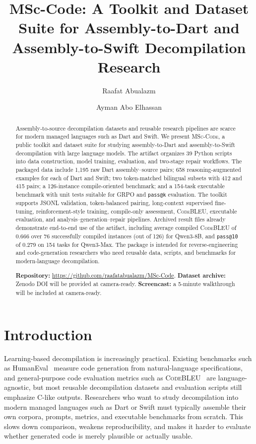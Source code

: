 \documentclass[sigconf,review]{acmart}
\title{MSc-Code: A Toolkit and Dataset Suite for Assembly-to-Dart and Assembly-to-Swift Decompilation Research}
\author{Raafat Abualazm}
\affiliation{%
  \institution{Faculty of Engineering, Cairo University}
  \city{Giza}
  \country{Egypt}
}
\author{Ayman Abo Elhassan}
\affiliation{%
  \institution{Faculty of Engineering, Cairo University}
  \city{Giza}
  \country{Egypt}
}
\begin{document}
\begin{abstract}
Assembly-to-source decompilation datasets and reusable research pipelines are scarce for modern managed languages such as Dart and Swift. We present \textsc{MSc-Code}, a public toolkit and dataset suite for studying assembly-to-Dart and assembly-to-Swift decompilation with large language models. The artifact organizes 39 Python scripts into data construction, model training, evaluation, and two-stage repair workflows. The packaged data include 1,195 raw Dart assembly--source pairs; 658 reasoning-augmented examples for each of Dart and Swift; two token-matched bilingual subsets with 412 and 415 pairs; a 126-instance compile-oriented benchmark; and a 154-task executable benchmark with unit tests suitable for GRPO and \texttt{pass@k} evaluation. The toolkit supports JSONL validation, token-balanced pairing, long-context supervised fine-tuning, reinforcement-style training, compile-only assessment, \textsc{CodeBLEU}, executable evaluation, and analysis--generation--repair pipelines. Archived result files already demonstrate end-to-end use of the artifact, including average compiled \textsc{CodeBLEU} of 0.666 over 76 successfully compiled instances (out of 126) for Qwen3-8B, and \texttt{pass@10} of 0.279 on 154 tasks for Qwen3-Max. The package is intended for reverse-engineering and code-generation researchers who need reusable data, scripts, and benchmarks for modern-language decompilation.

\smallskip
\noindent\textbf{Repository:} \url{https://github.com/raafatabualazm/MSc-Code}. \textbf{Dataset archive:} Zenodo DOI will be provided at camera-ready. \textbf{Screencast:} a 5-minute walkthrough will be included at camera-ready.
\end{abstract}


\maketitle

\section{Introduction}
Learning-based decompilation is increasingly practical. Existing benchmarks such as HumanEval~\cite{chen2021codex} measure code generation from natural-language specifications, and general-purpose code evaluation metrics such as \textsc{CodeBLEU}~\cite{ren2020codebleu} are language-agnostic, but most reusable decompilation datasets and evaluation scripts still emphasize C-like outputs. Researchers who want to study decompilation into modern managed languages such as Dart or Swift must typically assemble their own corpora, prompts, metrics, and executable benchmarks from scratch. This slows down comparison, weakens reproducibility, and makes it harder to evaluate whether generated code is merely plausible or actually usable.
\end{document}
